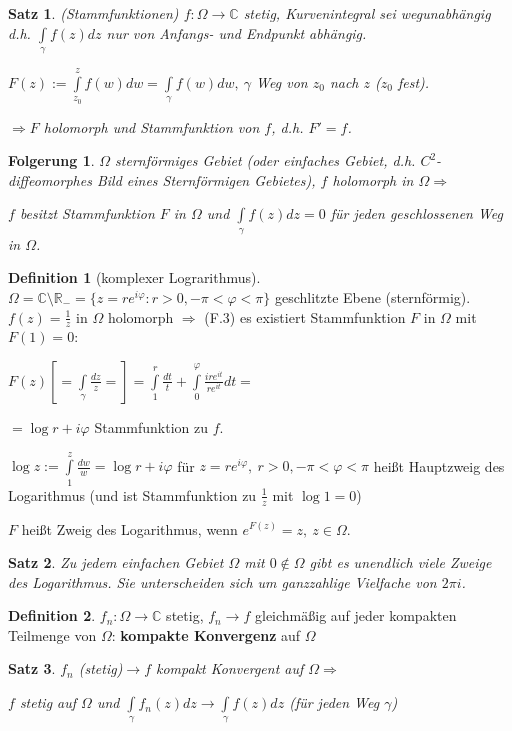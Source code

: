 \documentclass[ngerman,halfparskip]{scrartcl}
\newtheorem*{satz}{Satz}
\newtheorem*{folg}{Folgerung}
\theoremstyle{definition}
\newtheorem*{defin}{Definition}
\def\R{\mathbb R}
\def\C{\mathbb C}
\begin{document}
\begin{satz}(Stammfunktionen)
$f:\Omega\rightarrow \C$ stetig, Kurvenintegral sei wegunabhängig d.h. $\int\limits_\gamma f(z)dz$ nur von Anfangs- und Endpunkt abhängig.

$F(z):=\int\limits_{z_0}^z f(w)dw=\int\limits_\gamma f(w)dw, ~ \gamma$ Weg von $z_0$ nach $z$ ($z_0$ fest).

$\Rightarrow F$ holomorph und Stammfunktion von $f$, d.h. $F'=f$.
\end{satz}

\begin{folg} $\Omega$ sternförmiges Gebiet (oder einfaches Gebiet, d.h. $C^2$-diffeomorphes Bild eines Sternförmigen Gebietes), $f$ holomorph in $\Omega \Rightarrow$

$f$ besitzt Stammfunktion $F$ in $\Omega$ und $\int\limits _\gamma f(z)dz=0$ für jeden geschlossenen Weg in $\Omega$.

\end{folg}
\begin{defin}[komplexer Lograrithmus] $\Omega=\C \setminus \R_- =\{z=re^{i\varphi}: r>0, -\pi < \varphi < \pi \}$ geschlitzte Ebene (sternförmig). $f(z)=\frac 1z$ in $\Omega$ holomorph $\Rightarrow$ (F.3) es existiert Stammfunktion $F$ in $\Omega$ mit $F(1)=0$:

$F(z)[=\int\limits_\gamma \frac{dz}{z}=]=\int\limits_1^r\frac {dt}t +\int\limits _0^\varphi \frac{ire^{it}}{re^{it}}dt=$

$=\log r +i\varphi$ Stammfunktion zu $f$.

$\log z:=\int\limits _1^z\frac{dw}w=\log r+i\varphi$ für $z=re^{i\varphi}, ~r>0, -\pi<\varphi<\pi$ heißt Hauptzweig des Logarithmus (und ist Stammfunktion zu $\frac 1z$ mit $\log 1=0$)

$F$ heißt Zweig des Logarithmus, wenn $e^{F(z)}=z, ~z\in\Omega$.
\end{defin}

\begin{satz} Zu jedem einfachen Gebiet $\Omega$ mit $0\notin\Omega$ gibt es unendlich viele Zweige des Logarithmus. Sie unterscheiden sich um ganzzahlige Vielfache von $2\pi i$.
\end{satz}

\begin{defin}
$f_n:\Omega \rightarrow\C$ stetig, $f_n\rightarrow f$ gleichmäßig auf jeder kompakten Teilmenge von $\Omega$: \textbf{kompakte Konvergenz} auf $\Omega$
\end{defin}

\begin{satz}
$f_n$ (stetig)$\rightarrow f$ kompakt Konvergent auf $\Omega \Rightarrow$

$f$ stetig auf $\Omega$ und $\int\limits_\gamma f_n(z)dz \rightarrow \int\limits_\gamma f(z) dz$ (für jeden Weg $\gamma$)
\end{satz}
\end{document}
